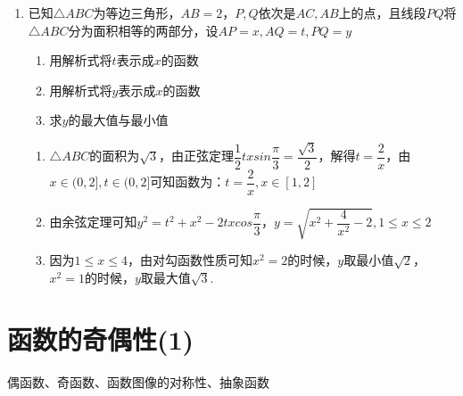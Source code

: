 \begin{enumerate}
    \begin{vspace_}
    \vsp[5]
    \end{vspace_}
    \item 已知$\triangle ABC$为等边三角形，$AB = 2$，$P, Q$依次是$AC, AB$上的点，且线段$PQ$将$\triangle ABC$分为面积相等的两部分，设$AP = x, AQ = t, PQ = y$
    \begin{enumerate}
        \item 用解析式将$t$表示成$x$的函数
        \item 用解析式将$y$表示成$x$的函数
        \item 求$y$的最大值与最小值
    \end{enumerate}
    \begin{jieda}
    \begin{enumerate}
        \item $\triangle ABC$的面积为$\sqrt{3}$，由正弦定理$\dfrac{1}{2}tx sin\dfrac{\pi}{3} = \dfrac{\sqrt{3}}{2}$，解得$t = \dfrac{2}{x}$，由$x \in (0, 2], t \in (0, 2]$可知函数为：$t = \dfrac{2}{x}, x \in [1, 2]$
        \item 由余弦定理可知$y^2 = t^2 + x^2 - 2txcos\dfrac{\pi}{3}$，$y = \sqrt{x^2 + \dfrac{4}{x^2} - 2}, 1 \leq x \leq 2$
        \item 因为$1 \leq x \leq 4$，由对勾函数性质可知$x^2 = 2$的时候，$y$取最小值$\sqrt{2}$，$x^2 = 1$的时候，$y$取最大值$\sqrt{3}$.
    \end{enumerate}
    \end{jieda}
    
    \begin{vspace_}
    \vsp[5]
    \end{vspace_}
\end{enumerate}


\section{函数的奇偶性(1)}

\zsd 偶函数、奇函数、函数图像的对称性、抽象函数

